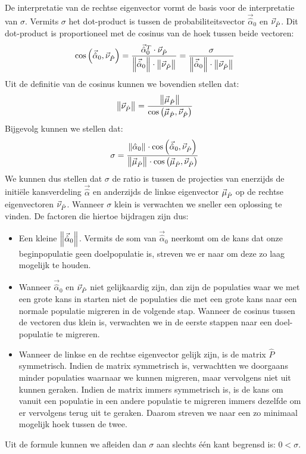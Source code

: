 De interpretatie van de rechtse eigenvector vormt de basis voor de interpretatie van $\sigma$. Vermits $\sigma$ het dot-product is tussen de probabiliteitsvector $\vec{\hat{\alpha}}_0$ en $\evr[\hat{P}]$. Dit dot-product is proportioneel met de cosinus van de hoek tussen beide vectoren:
\begin{equation}
\fun{\cos}{\vec{\hat{\alpha}}_0,\evr[\hat{P}]}=\displaystyle\frac{\vec{\hat{\alpha}}_0^T\cdot\evr[\hat{P}]}{\dabs{\vec{\hat{\alpha}}_0}\cdot\dabs{\evr[\hat{P}]}}=\displaystyle\frac{\sigma}{\dabs{\vec{\hat{\alpha}}_0}\cdot\dabs{\evr[\hat{P}]}}
\end{equation}
Uit de definitie van de cosinus kunnen we bovendien stellen dat:
\begin{equation}
\dabs{\evr[\hat{P}]}=\displaystyle\frac{\dabs{\evl[\hat{P}]}}{\fun{\cos}{\evl[\hat{P}],\evr[\hat{P}]}}
\end{equation}
Bijgevolg kunnen we stellen dat:
\begin{equation}
\sigma=\displaystyle\frac{\dabs{\hat{\alpha}_0}\cdot\fun{\cos}{\vec{\hat{\alpha}}_0,\evr[\hat{P}]}}{\dabs{\evl[\hat{P}]}\cdot\fun{\cos}{\evl[\hat{P}],\evr[\hat{P}]}}
\eqnlab{sigmaMeaning}
\end{equation}
We kunnen dus stellen dat $\sigma$ de ratio is tussen de projecties van enerzijds de initi\"ele kansverdeling $\vec{\hat{\alpha}}$ en anderzijds de linkse eigenvector $\evl[\hat{P}]$ op de rechtse eigenvectoren $\evr[\hat{P}]$. Wanneer $\sigma$ klein is verwachten we sneller een oplossing te vinden. De factoren die hiertoe bijdragen zijn dus:
\begin{itemize}
 \item Een kleine $\dabs{\vec{\hat{\alpha}}_0}$. Vermits de som van $\vec{\hat{\alpha}}_0$ neerkomt om de kans dat onze beginpopulatie geen doelpopulatie is, streven we er naar om deze zo laag mogelijk te houden.
 \item Wanneer $\vec{\hat{\alpha}}_0$ en $\evr[\hat{P}]$ niet gelijkaardig zijn, dan zijn de populaties waar we met een grote kans in starten niet de populaties die met een grote kans naar een normale populatie migreren in de volgende stap. Wanneer de cosinus tussen de vectoren dus klein is, verwachten we in de eerste stappen naar een doel-populatie te migreren.
 \item Wanneer de linkse en de rechtse eigenvector gelijk zijn, is de matrix $\hat{P}$ symmetrisch. Indien de matrix symmetrisch is, verwachtten we doorgaans minder populaties waarnaar we kunnen migreren, maar vervolgens niet uit kunnen geraken. Indien de matrix immers symmetrisch is, is de kans om vanuit een populatie in een andere populatie te migreren immers dezelfde om er vervolgens terug uit te geraken. Daarom streven we naar een zo minimaal mogelijk hoek tussen de twee.
\end{itemize}
Uit de formule kunnen we afleiden dan $\sigma$ aan slechts \'e\'en kant begrensd is: $0<\sigma$.

